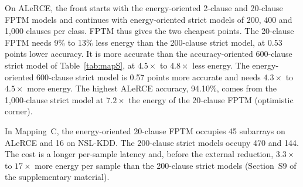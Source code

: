 \documentclass[preprint,review,12pt]{elsarticle}
\newcommand{\wosnew}[1]{#1}   %
\begin{document}
\wosnew{On ALeRCE, the front starts with the energy-oriented 2-clause and 20-clause FPTM models and continues with energy-oriented strict models of 200, 400 and 1,000 clauses per class.
FPTM thus gives the two cheapest points. The 20-clause FPTM needs 9\% to 13\% less energy than the 200-clause strict model, at 0.53 points lower accuracy.
It is more accurate than the accuracy-oriented 600-clause strict model of Table~\ref{tab:mapS}, at $4.5\times$ to $4.8\times$ less energy. The energy-oriented 600-clause strict model is 0.57 points more accurate and needs $4.3\times$ to $4.5\times$ more energy.
The highest ALeRCE accuracy, 94.10\%, comes from the 1,000-clause strict model at $7.2\times$ the energy of the 20-clause FPTM (optimistic corner).}

\wosnew{In Mapping~C, the energy-oriented 20-clause FPTM occupies 45 subarrays on ALeRCE and 16 on NSL-KDD. The 200-clause strict models occupy 470 and 144.
The cost is a longer per-sample latency and, before the external reduction, $3.3\times$ to $17\times$ more energy per sample than the 200-clause strict models (Section~S9 of the supplementary material).}
\end{document}
